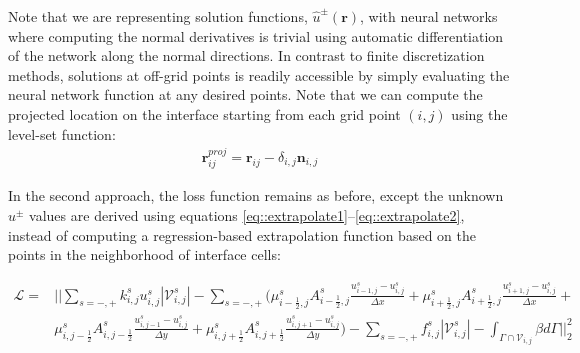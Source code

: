 \documentclass{elsarticle}
\begin{document}
Note that we are representing solution functions, $\hat{u}^\pm(\mathbf{r})$, with neural networks where computing the normal derivatives is trivial using automatic differentiation of the network along the normal directions. In contrast to finite discretization methods, solutions at off-grid points is readily accessible by simply evaluating the neural network function at any desired points. Note that we can compute the projected location on the interface starting from each grid point $(i,j)$ using the level-set function:
\begin{align*}
\mathbf{r}_{ij}^{proj}=\mathbf{r}_{ij} - \delta_{i,j} \mathbf{n}_{i,j}
\end{align*}


In the second approach, the loss function remains as before, except the unknown $u^\pm$ values are derived using equations \ref{eq::extrapolate1}--\ref{eq::extrapolate2}, instead of computing a regression-based extrapolation function based on the points in the neighborhood of interface cells: 

\begin{align*}
\mathcal{L} = & \bigg\vert\bigg\vert \sum_{s=-,+} k_{i,j}^s u_{i,j}^{s} |\mathcal{V}_{i,j}^s| - \sum_{s=-,+}\bigg( \mu_{i-\frac{1}{2},j}^s A_{i-\frac{1}{2},j}^s\frac{u_{i-1,j}^s - u_{i,j}^s}{\Delta x}     +   \mu_{i+\frac{1}{2},j}^s A_{i+\frac{1}{2},j}^s\frac{u_{i+1,j}^s - u_{i,j}^s}{\Delta x} +                                                          \\
	 & \mu_{i, j-\frac{1}{2}}^s A_{i, j-\frac{1}{2}}^s\frac{u_{i,j-1}^s - u_{i,j}^s}{\Delta y} + \mu_{i, j+\frac{1}{2}}^s A_{i, j+\frac{1}{2}}^s\frac{u_{i,j+1}^s - u_{i,j}^s}{\Delta y} \bigg)  -  \sum_{s=-,+} f_{i,j}^{s} |\mathcal{V}_{i,j}^s| - \int_{\Gamma\cap \mathcal{V}_{i,j}} \beta d\Gamma \bigg\vert\bigg\vert_2^2
\end{align*}
\end{document}
